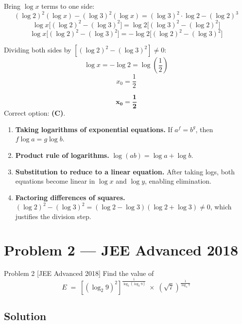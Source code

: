 \documentclass[12pt]{article}
\begin{document}
Bring $\log x$ terms to one side:
\[
(\log 2)^2(\log x) - (\log 3)^2(\log x) = (\log 3)^2 \cdot \log 2 - (\log 2)^3
\]
\[
\log x\bigl[(\log 2)^2 - (\log 3)^2\bigr] = \log 2\bigl[(\log 3)^2 - (\log 2)^2\bigr]
\]
\[
\log x\bigl[(\log 2)^2 - (\log 3)^2\bigr] = -\log 2\bigl[(\log 2)^2 - (\log 3)^2\bigr]
\]

Dividing both sides by $[(\log 2)^2 - (\log 3)^2] \neq 0$:
\[
\log x = -\log 2 = \log\!\left(\frac{1}{2}\right)
\]
\[
\boxed{x_0 = \dfrac{1}{2}}
\]

\begin{answerbox}
\[\mathbf{x_0 = \dfrac{1}{2}}\]
Correct option: \textbf{(C)}.
\end{answerbox}

\begin{propbox}
\begin{enumerate}[leftmargin=*, label=\textbf{P\arabic*.}]
  \item \textbf{Taking logarithms of exponential equations.}  
  If $a^f = b^g$, then $f \log a = g \log b$.

  \item \textbf{Product rule of logarithms.}  
  $\log(ab) = \log a + \log b$.

  \item \textbf{Substitution to reduce to a linear equation.}  
  After taking logs, both equations become linear in $\log x$ and $\log y$, enabling elimination.

  \item \textbf{Factoring differences of squares.}  
  $(\log 2)^2 - (\log 3)^2 = (\log 2 - \log 3)(\log 2 + \log 3) \neq 0$, which justifies the division step.
\end{enumerate}
\end{propbox}

\section{Problem 2 — JEE Advanced 2018}

\begin{problembox}{Problem 2 \hfill \normalfont\small [JEE Advanced 2018]}
Find the value of
\[
E \;=\; \left[(\log_2 9)^2\right]^{\!\frac{1}{\log_2(\log_2 9)}}
\;\times\;
\left(\sqrt{7}\right)^{\!\frac{1}{\log_4 7}}
\]
\end{problembox}

\subsection*{Solution}
\end{document}
